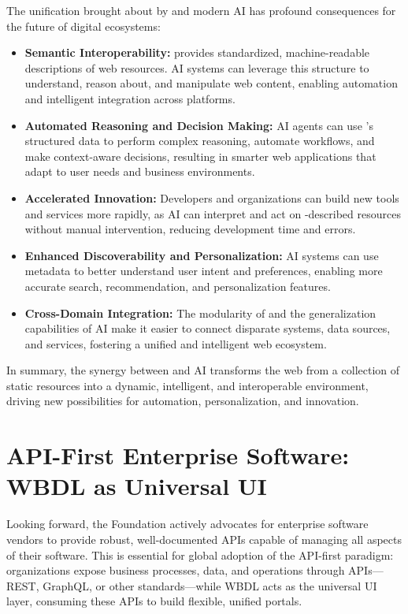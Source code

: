 The unification brought about by \wbdl{} and modern AI has profound consequences for the future of digital ecosystems:
\begin{itemize}
	\item \textbf{Semantic Interoperability:} \wbdl{} provides standardized, machine-readable descriptions of web resources. AI systems can leverage this structure to understand, reason about, and manipulate web content, enabling automation and intelligent integration across platforms.
	\item \textbf{Automated Reasoning and Decision Making:} AI agents can use \wbdl{}'s structured data to perform complex reasoning, automate workflows, and make context-aware decisions, resulting in smarter web applications that adapt to user needs and business environments.
	\item \textbf{Accelerated Innovation:} Developers and organizations can build new tools and services more rapidly, as AI can interpret and act on \wbdl{}-described resources without manual intervention, reducing development time and errors.
	\item \textbf{Enhanced Discoverability and Personalization:} AI systems can use \wbdl{} metadata to better understand user intent and preferences, enabling more accurate search, recommendation, and personalization features.
	\item \textbf{Cross-Domain Integration:} The modularity of \wbdl{} and the generalization capabilities of AI make it easier to connect disparate systems, data sources, and services, fostering a unified and intelligent web ecosystem.
\end{itemize}

In summary, the synergy between \wbdl{} and AI transforms the web from a collection of static resources into a dynamic, intelligent, and interoperable environment, driving new possibilities for automation, personalization, and innovation.

\section{API-First Enterprise Software: WBDL as Universal UI}

Looking forward, the Foundation actively advocates for enterprise software vendors to provide robust, well-documented APIs capable of managing all aspects of their software. This is essential for global adoption of the API-first paradigm: organizations expose business processes, data, and operations through APIs—REST, GraphQL, or other standards—while WBDL acts as the universal UI layer, consuming these APIs to build flexible, unified portals.

